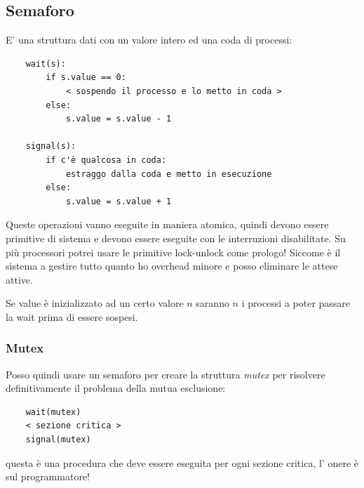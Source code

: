 \subsection{Semaforo}
E' una struttura dati con un valore intero ed una coda di processi:
\begin{verbatim}
    wait(s):
        if s.value == 0:
            < sospendo il processo e lo metto in coda >
        else:
            s.value = s.value - 1

    signal(s):
        if c'è qualcosa in coda:
            estraggo dalla coda e metto in esecuzione
        else:
            s.value = s.value + 1
\end{verbatim}
Queste operazioni vanno eseguite in maniera atomica, quindi devono essere primitive di sistema e devono essere eseguite con le interruzioni disabilitate.
Su più processori potrei usare le primitive lock-unlock come prologo!
Siccome è il sistema a gestire tutto quanto ho overhead minore e posso eliminare le attese attive.

Se value è inizializzato ad un certo valore $n$ saranno $n$ i processi a poter passare la wait prima di essere sospesi.

\subsubsection{Mutex}
Posso quindi usare un semaforo per creare la struttura \emph{mutex} per risolvere definitivamente il problema della mutua esclusione:
\begin{verbatim}
    wait(mutex)
    < sezione critica >
    signal(mutex)
\end{verbatim}
questa è una procedura che deve essere eseguita per ogni sezione critica, l' onere è sul programmatore! 

